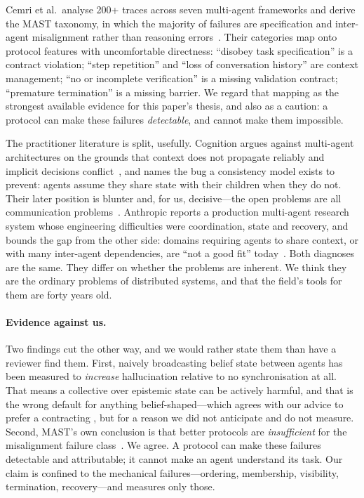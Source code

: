 Cemri et al.\ analyse 200+ traces across seven multi-agent frameworks and
derive the MAST taxonomy, in which the majority of failures are
specification and inter-agent misalignment rather than reasoning
errors~\cite{cemri2025mast}. Their categories map onto protocol features
with uncomfortable directness: ``disobey task specification'' is a contract
violation; ``step repetition'' and ``loss of conversation history'' are
context management; ``no or incomplete verification'' is a missing
validation contract; ``premature termination'' is a missing barrier. We
regard that mapping as the strongest available evidence for this paper's
thesis, and also as a caution: a protocol can make these failures
\emph{detectable}, and cannot make them impossible.

The practitioner literature is split, usefully. Cognition argues against
multi-agent architectures on the grounds that context does not propagate
reliably and implicit decisions conflict~\cite{yan2025dontbuild}, and names
the bug a consistency model exists to prevent: agents assume they share
state with their children when they do not. Their later position is blunter
and, for us, decisive---the open problems are all communication
problems~\cite{yan2026multiagentsworking}. Anthropic reports a production
multi-agent research system whose engineering difficulties were
coordination, state and recovery, and bounds the gap from the other side:
domains requiring agents to share context, or with many inter-agent
dependencies, are ``not a good fit''
today~\cite{anthropic2025multiagent}. Both diagnoses are the same. They
differ on whether the problems are inherent. We think they are the ordinary
problems of distributed systems, and that the field's tools for them are
forty years old.

\paragraph{Evidence against us.} Two findings cut the other way, and we
would rather state them than have a reviewer find them. First, naively
broadcasting belief state between agents has been measured to
\emph{increase} hallucination relative to no synchronisation at all. That
means a collective over epistemic state can be actively harmful, and that
 is the wrong default for anything belief-shaped---which
agrees with our advice to prefer a contracting , but for a
reason we did not anticipate and do not measure. Second, MAST's own
conclusion is that better protocols are \emph{insufficient} for the
misalignment failure class~\cite{cemri2025mast}. We agree. A protocol can
make these failures detectable and attributable; it cannot make an agent
understand its task. Our claim is confined to the mechanical
failures---ordering, membership, visibility, termination, recovery---and
 measures only those.

